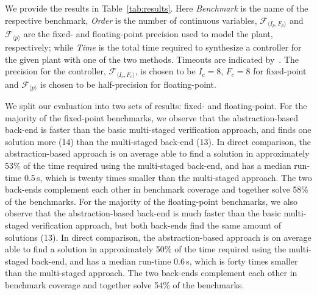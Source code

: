 \documentclass[twocolumn]{autart}    %
\newcommand{\xmark}{\ding{55}}
\begin{document}
We provide the results in Table~\ref{tab:results}.  Here 
\textit{Benchmark} is the name of the respective benchmark, 
\textit{Order} is the number of continuous variables, 
$\mathcal{F}_{\langle I_p,F_p \rangle}$ and $\mathcal{F}_{\langle p \rangle}$  
are the fixed- and floating-point precision used to model the plant, respectively;
while \textit{Time} is the total time required to synthesize a controller for the given
plant with one of the two methods.  Timeouts are indicated by~\xmark.  The
precision for the controller, $\mathcal{F}_{\langle I_c,F_c \rangle}$, is
chosen to be $I_c = 8$, $F_c = 8$ for fixed-point and 
$\mathcal{F}_{\langle p \rangle}$ is chosen to be half-precision for floating-point.

We split our evaluation into two sets of results: fixed- and floating-point. 
For the majority of the fixed-point benchmarks, we observe that the abstraction-based
back-end is faster than the basic multi-staged verification approach, and
finds one solution more (14) than the multi-staged back-end (13).  In direct
comparison, the abstraction-based approach is on average able to find a
solution in approximately 53\% of the time required using the multi-staged
back-end, and has a median run-time 0.5\,s, which is twenty times smaller
than the multi-staged approach.  The two back-ends complement each other in
benchmark coverage and together solve 58\% of the benchmarks.
%
For the majority of the floating-point benchmarks, we also observe that the abstraction-based
back-end is much faster than the basic multi-staged verification approach, but both
back-ends find the same amount of solutions (13).  In direct
comparison, the abstraction-based approach is on average able to find a
solution in approximately 50\% of the time required using the multi-staged
back-end, and has a median run-time 0.6\,s, which is forty times smaller
than the multi-staged approach.  The two back-ends complement each other in
benchmark coverage and together solve 54\% of the benchmarks.
\end{document}
